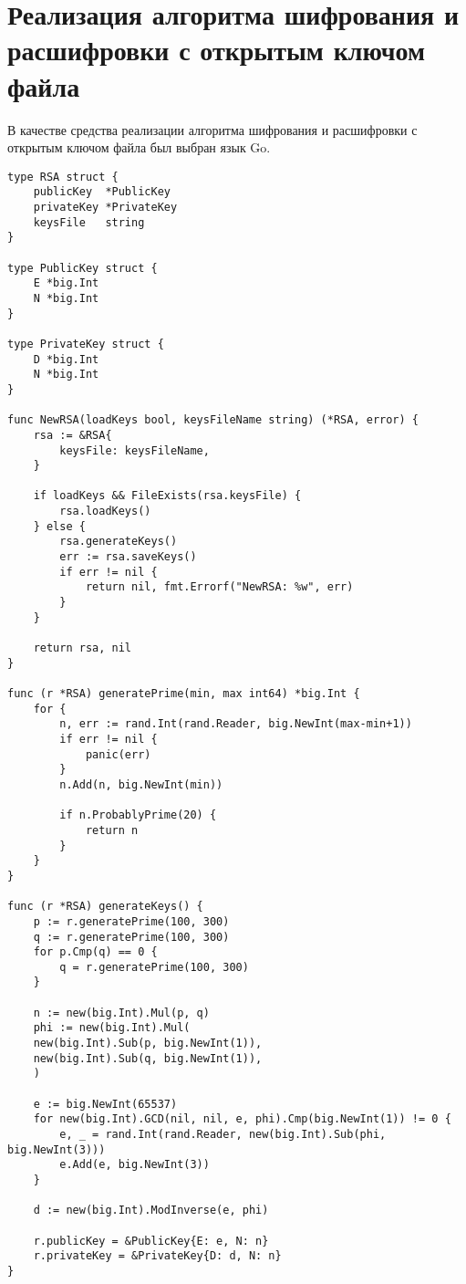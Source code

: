 \FloatBarrier
{}
\FloatBarrier

\chapter{Реализация алгоритма шифрования и расшифровки с открытым ключом файла}
В качестве средства реализации алгоритма шифрования и расшифровки с открытым ключом файла был выбран язык Go.

\begin{lstlisting}[style=golang, caption={Реализация алгоритма шифрования и расшифровки с открытым ключом файла}, label=lst:codegolang]
type RSA struct {
	publicKey  *PublicKey
	privateKey *PrivateKey
	keysFile   string
}

type PublicKey struct {
	E *big.Int
	N *big.Int
}

type PrivateKey struct {
	D *big.Int
	N *big.Int
}

func NewRSA(loadKeys bool, keysFileName string) (*RSA, error) {
	rsa := &RSA{
		keysFile: keysFileName,
	}
	
	if loadKeys && FileExists(rsa.keysFile) {
		rsa.loadKeys()
	} else {
		rsa.generateKeys()
		err := rsa.saveKeys()
		if err != nil {
			return nil, fmt.Errorf("NewRSA: %w", err)
		}
	}
	
	return rsa, nil
}

func (r *RSA) generatePrime(min, max int64) *big.Int {
	for {
		n, err := rand.Int(rand.Reader, big.NewInt(max-min+1))
		if err != nil {
			panic(err)
		}
		n.Add(n, big.NewInt(min))
		
		if n.ProbablyPrime(20) {
			return n
		}
	}
}

func (r *RSA) generateKeys() {
	p := r.generatePrime(100, 300)
	q := r.generatePrime(100, 300)
	for p.Cmp(q) == 0 {
		q = r.generatePrime(100, 300)
	}
	
	n := new(big.Int).Mul(p, q)
	phi := new(big.Int).Mul(
	new(big.Int).Sub(p, big.NewInt(1)),
	new(big.Int).Sub(q, big.NewInt(1)),
	)
	
	e := big.NewInt(65537)
	for new(big.Int).GCD(nil, nil, e, phi).Cmp(big.NewInt(1)) != 0 {
		e, _ = rand.Int(rand.Reader, new(big.Int).Sub(phi, big.NewInt(3)))
		e.Add(e, big.NewInt(3))
	}
	
	d := new(big.Int).ModInverse(e, phi)
	
	r.publicKey = &PublicKey{E: e, N: n}
	r.privateKey = &PrivateKey{D: d, N: n}
}


\end{lstlisting}
